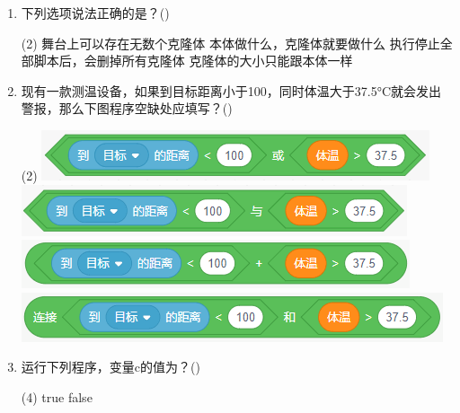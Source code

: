 \documentclass[10pt, a4paper]{article}
\newcommand{\hq}{\hfill(\qquad)}
\begin{document}
\begin{enumerate}
        \item 下列选项说法正确的是？\hq
        \begin{tasks}(2)
            \task 舞台上可以存在无数个克隆体
            \task 本体做什么，克隆体就要做什么
            \task 执行停止全部脚本后，会删掉所有克隆体
            \task 克隆体的大小只能跟本体一样
        \end{tasks}

        \item 现有一款测温设备，如果到目标距离小于100，同时体温大于37.5°C就会发出警报，那么下图程序空缺处应填写？\hq
        \begin{tasks}(2)
            \task \includegraphics[width=.25\textwidth]{figure/24a.png}
            \task \includegraphics[width=.25\textwidth]{figure/24b.png}
            \task \includegraphics[width=.25\textwidth]{figure/24c.png}
            \task \includegraphics[width=.25\textwidth]{figure/24d.png}
        \end{tasks}

        \item 运行下列程序，变量c的值为？\hq
        \begin{tasks}(4)
            \task true
            \task false
        \end{tasks}
    \end{enumerate}
\end{document}

